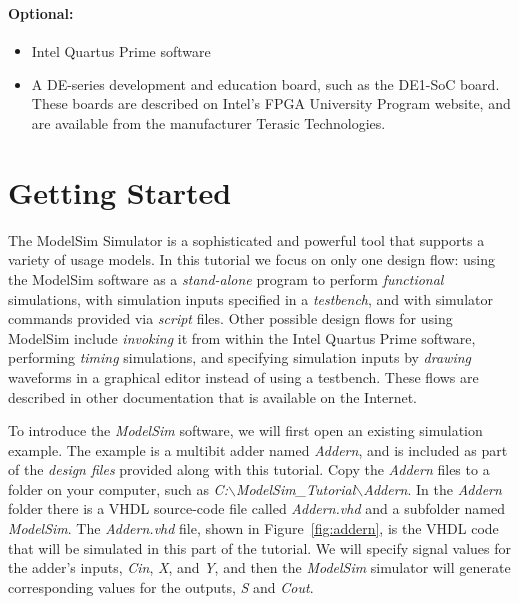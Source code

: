 \documentclass[11pt, twoside, pdftex]{article}
\begin{document}
{\bf Optional:}
\begin{itemize}
\item Intel Quartus\textsuperscript{\textregistered} Prime software
\item A DE-series development and education board, such as the DE1-SoC board. These boards are 
described on Intel's FPGA University Program website, and are available from the manufacturer 
Terasic Technologies.
\end{itemize}

\clearpage
\newpage
\section{Getting Started}

The ModelSim Simulator is a sophisticated and powerful tool that supports a variety of 
usage models. In this tutorial we focus on only one design flow: using the ModelSim
software as a {\it stand-alone} program to perform {\it functional} simulations, with 
simulation inputs specified in a {\it testbench}, and with simulator commands provided 
via {\it script} files. Other possible design flows for using ModelSim include {\it invoking}
it from within the Intel Quartus Prime software, performing {\it timing} simulations, and
specifying simulation inputs by {\it drawing} waveforms in a graphical editor instead of
using a testbench. These flows are described in other
documentation that is available on the Internet.  

\noindent
To introduce the {\it ModelSim} software, we will first open an existing simulation example.
The example is a multibit adder named {\it Addern}, and is included as 
part of the {\it design files} provided
along with this tutorial. Copy the {\it Addern} files to a folder on your computer, such
as {\it C:$\backslash$ModelSim\_Tutorial$\backslash$Addern}. In the {\it Addern} folder
there is a VHDL source-code file called {\it Addern.vhd} and a subfolder named {\it ModelSim}.
The {\it Addern.vhd} file, shown in Figure~\ref{fig:addern}, is the VHDL code that will 
be simulated in this part of the tutorial. We will specify signal 
values for the adder's inputs, {\it Cin}, {\it X}, and {\it Y}, and then the {\it
ModelSim} simulator will generate corresponding values for the outputs, {\it S} and {\it Cout}.
\end{document}
